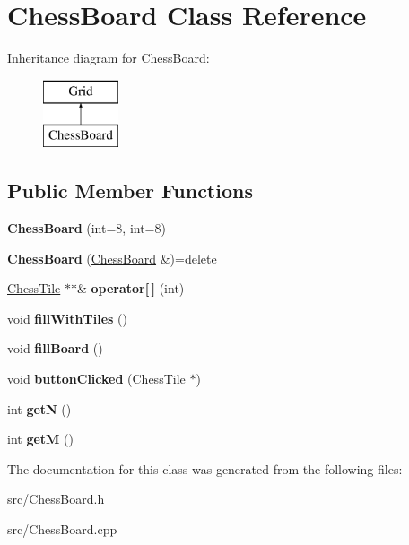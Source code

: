 \hypertarget{classChessBoard}{}\section{Chess\+Board Class Reference}
\label{classChessBoard}
Inheritance diagram for Chess\+Board\+:\begin{figure}[H]
\begin{center}
\leavevmode
\includegraphics[height=2.000000cm]{classChessBoard}
\end{center}
\end{figure}
\subsection*{Public Member Functions}
\begin{DoxyCompactItemize}
\item 
\mbox{\label{classChessBoard_ab905b19c4a54f58d3e9490ae058d50f3}} 
{\bfseries Chess\+Board} (int=8, int=8)
\item 
\mbox{\label{classChessBoard_aa52c65d2811e1b16f645968c7376e490}} 
{\bfseries Chess\+Board} (\mbox{\hyperlink{classChessBoard}{Chess\+Board}} \&)=delete
\item 
\mbox{\label{classChessBoard_a5fef5d9dd63b08d21926fa357633d7a3}} 
\mbox{\hyperlink{classChessTile}{Chess\+Tile}} $\ast$$\ast$\& {\bfseries operator\mbox{[}$\,$\mbox{]}} (int)
\item 
\mbox{\label{classChessBoard_a7f2b454b63cad50b551a42995fe20b92}} 
void {\bfseries fill\+With\+Tiles} ()
\item 
\mbox{\label{classChessBoard_a104b758d5c28f2b31e12d34b467c37f5}} 
void {\bfseries fill\+Board} ()
\item 
\mbox{\label{classChessBoard_a91e32cb7b5139c304d552a4148030033}} 
void {\bfseries button\+Clicked} (\mbox{\hyperlink{classChessTile}{Chess\+Tile}} $\ast$)
\item 
\mbox{\label{classChessBoard_acc60486a0fafa95c85263e15e6b7f6ab}} 
int {\bfseries getN} ()
\item 
\mbox{\label{classChessBoard_a490cb74dc406003683738ab23372e66e}} 
int {\bfseries getM} ()
\end{DoxyCompactItemize}


The documentation for this class was generated from the following files\+:\begin{DoxyCompactItemize}
\item 
src/Chess\+Board.\+h\item 
src/Chess\+Board.\+cpp\end{DoxyCompactItemize}
